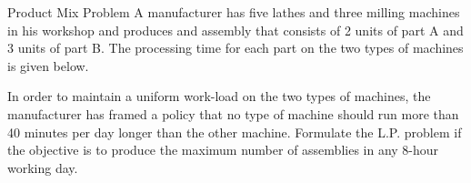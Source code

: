 \begin{frameExample}{Product Mix Problem}{}
  A manufacturer has five lathes and three milling machines in his workshop and produces and assembly that consists of 2 units of part A and 3 units of part B. The processing time for each part on the two types of machines is given below.

  {
    \centering
    \par
  }

  In order to maintain a uniform work-load on the two types of machines, the manufacturer has framed a policy that no type of machine should run more than 40 minutes per day longer than the other machine. Formulate the L.P. problem if the objective is to produce the maximum number of assemblies in any 8-hour working day.
\end{frameExample}


